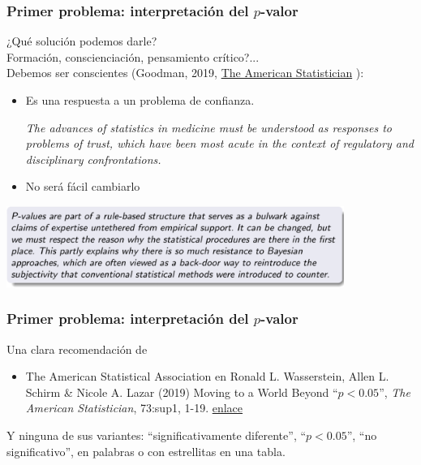 \documentclass[9pt]{beamer}
\begin{document}
\begin{frame}
  \frametitle{Primer problema: interpretación del $p$-valor}
    \begin{overlayarea}{\textwidth}{0.8\textheight}
  ¿Qué solución podemos darle?\\
  Formación, conscienciación, pensamiento crítico?...\\
  Debemos ser conscientes (Goodman,
  2019, \href{https://doi.org/10.1080/00031305.2018.1558111}{The
    American Statistician} ): 
  \begin{itemize}
  \item Es una respuesta a un problema de confianza.
    \begin{block}{}
      \textit{The advances of statistics in medicine must be understood as responses to problems of trust, which have been most acute in the context of regulatory and disciplinary confrontations.}
    \end{block}
  \item<+-> No será fácil cambiarlo
  \end{itemize}
  \begin{center}
      \includegraphics[width=11cm]{images/goodman_bayes_0}
    \end{center}
\end{overlayarea}
\end{frame}

\begin{frame}
  \frametitle{Primer problema: interpretación del $p$-valor}
  Una clara recomendación de
  \begin{itemize}
  \item   The American Statistical Association en Ronald L. Wasserstein, Allen L. Schirm \& Nicole A. Lazar (2019)
  Moving to a World Beyond ``$p < 0.05$'', \textit{The American
    Statistician}, 73:sup1,
  1-19. \href{https://doi.org/10.1080/00031305.2019.1583913}{enlace}

  \end{itemize}\medskip{}

\begin{center}
 \end{center}\medskip
 
 Y ninguna de sus variantes: ``significativamente diferente'', ``$p < 0.05$'', ``no significativo'', en palabras o con estrellitas en una tabla.
\end{frame}
\end{document}
